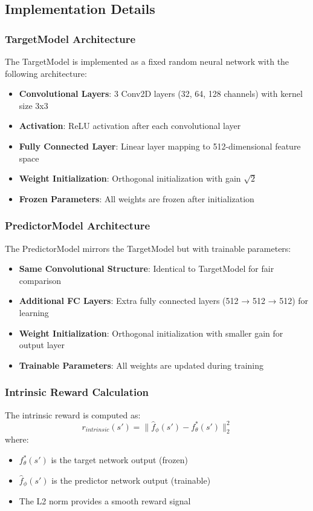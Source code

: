 \documentclass[12pt]{article}
\begin{document}
{{{\subsection{Implementation Details}

\subsubsection{TargetModel Architecture}
The TargetModel is implemented as a fixed random neural network with the following architecture:
\begin{itemize}
    \item \textbf{Convolutional Layers}: 3 Conv2D layers (32, 64, 128 channels) with kernel size 3x3
    \item \textbf{Activation}: ReLU activation after each convolutional layer
    \item \textbf{Fully Connected Layer}: Linear layer mapping to 512-dimensional feature space
    \item \textbf{Weight Initialization}: Orthogonal initialization with gain $\sqrt{2}$
    \item \textbf{Frozen Parameters}: All weights are frozen after initialization
\end{itemize}

\subsubsection{PredictorModel Architecture}
The PredictorModel mirrors the TargetModel but with trainable parameters:
\begin{itemize}
    \item \textbf{Same Convolutional Structure}: Identical to TargetModel for fair comparison
    \item \textbf{Additional FC Layers}: Extra fully connected layers (512 → 512 → 512) for learning
    \item \textbf{Weight Initialization}: Orthogonal initialization with smaller gain for output layer
    \item \textbf{Trainable Parameters}: All weights are updated during training
\end{itemize}

\subsubsection{Intrinsic Reward Calculation}
The intrinsic reward is computed as:
\begin{equation}
r_{intrinsic}(s') = \|\hat{f}_\phi(s') - f^*_\theta(s')\|_2^2
\end{equation}
where:
\begin{itemize}
    \item $f^*_\theta(s')$ is the target network output (frozen)
    \item $\hat{f}_\phi(s')$ is the predictor network output (trainable)
    \item The L2 norm provides a smooth reward signal
\end{itemize}

}}}
\end{document}
